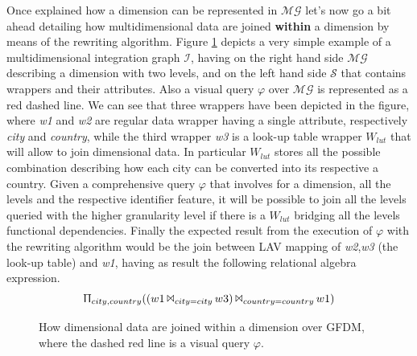 \documentclass[12pt,a4paper]{report}
\newcommand\systemName{GFDM}
\newcommand\globalQuery{\varphi}
\newcommand\sourceGraph{\mathcal{S}}
\newcommand\integrationGraph{\mathcal{I}}
\newcommand\lut{W_{lut}}
\newcommand\multidimensionalGraph{\mathcal{MG}}
\begin{document}
Once explained how a dimension can be represented in $\multidimensionalGraph$ let's now go a bit ahead detailing how multidimensional data are joined \textbf{within} a dimension by means of the rewriting algorithm.
%
Figure \ref{fig:Join} depicts a very simple example of a multidimensional integration graph $\integrationGraph$, having on the right hand side $\multidimensionalGraph$ describing a dimension with two levels, and on the left hand side $\sourceGraph$ that contains wrappers and their attributes.
%
Also a visual query $\globalQuery$ over $\multidimensionalGraph$ is represented as a red dashed line.
%
We can see that three wrappers have been depicted in the figure, where \textit{w1} and \textit{w2} are regular data wrapper having a single attribute, respectively \textit{city} and \textit{country}, while the third wrapper \textit{w3} is a look-up table wrapper $\lut$ that will allow to join dimensional data.
%
In particular $\lut$ stores all the possible combination describing how each city can be converted into its respective a country.
%
Given a comprehensive query $\globalQuery$ that involves for a dimension, all the levels and the respective identifier feature, it will be possible to join all the levels queried with the higher granularity level if there is a $\lut$ bridging all the levels functional dependencies.
%
Finally the expected result from the execution of $\globalQuery$ with the rewriting algorithm would be the join between LAV mapping of \textit{w2},\textit{w3} (the look-up table) and \textit{w1}, having as result the following relational algebra expression.
\begin{equation} 
    \Uppi_{city,country}((w1\, \Bowtie_{city=city}\, w3)\, \Bowtie_{country=country}\, w1)
\end{equation}
%
\begin{figure} [ht]
    \caption{How dimensional data are joined within a dimension over \systemName, where the dashed red line is a visual query $\globalQuery$.}
    \label{fig:Join}
\end{figure}
%
\end{document}
